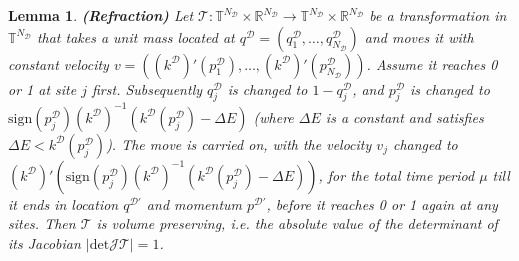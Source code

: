 \documentclass{article}
\newcommand{\cald}{\mathcal{D}}
\newtheorem{lemma}{Lemma}
\begin{document}
\begin{lemma}\label{lem:refraction} {\textbf{(Refraction)}} Let $\mathcal{T} : \mathbb{T}^{N_\cald} \times \mathbb{R}^{N_\cald} \rightarrow \mathbb{T}^{N_\cald} \times \mathbb{R}^{N_\cald}$ be a transformation in $\mathbb{T}^{N_\cald}$ that takes a unit mass located at $q^\cald = (q^\cald_1, \ldots, q^\cald_{N_\cald})$ and moves it with constant velocity $v = ((k^\cald)' (p^\cald_1), \ldots, (k^\cald)' (p^\cald_{N_\cald}))$. Assume it reaches 0 or 1 at site $j$ first. Subsequently $q^\cald_j$ is changed to $1-q^\cald_j$, and $p^\cald_j$ is changed to $\text{sign} (p^\cald_j) (k^\cald)^{- 1} (k^\cald (p^\cald_j) - \Delta E)$ (where $\Delta E$ is a constant and satisfies $\Delta E < k^\cald (p^\cald_j)$). The move is carried on, with the velocity $v_j$ changed to $(k^\cald)'(\text{sign} (p^\cald_j) (k^\cald)^{- 1} (k^\cald (p^\cald_j) - \Delta E))$, for the total time period $\mu$ till it ends in location $q^{\cald\prime}$ and momentum $p^{\cald\prime}$, before it reaches 0 or 1 again at any sites. Then $\mathcal{T}$ is volume preserving, i.e. the absolute value of the determinant of its Jacobian $|\text{det} \mathcal{J} \mathcal{T} | = 1$. 
\end{lemma}
\end{document}
